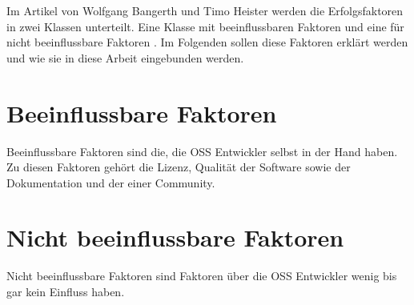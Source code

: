 
\noindent
Im Artikel von Wolfgang Bangerth und Timo Heister werden die Erfolgsfaktoren in zwei Klassen unterteilt.
Eine Klasse mit beeinflussbaren Faktoren und eine für nicht beeinflussbare Faktoren
\cite{bangerthWhatMakesComputational2013}.
Im Folgenden sollen diese Faktoren erklärt werden und wie sie in diese Arbeit eingebunden werden.




\section{Beeinflussbare Faktoren}


Beeinflussbare Faktoren sind die, die OSS Entwickler selbst in der Hand haben. Zu diesen Faktoren gehört
die Lizenz, Qualität der Software sowie der Dokumentation und der  einer Community.







\section{Nicht beeinflussbare Faktoren}

Nicht beeinflussbare Faktoren sind Faktoren über die OSS Entwickler wenig bis gar kein Einfluss haben.




